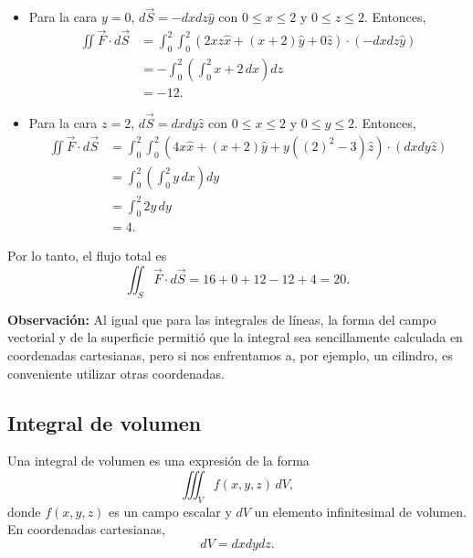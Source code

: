 \begin{ejemplo}
\begin{itemize}
        \item[(iv)] Para la cara $y = 0$, $d\Vec{S} = -dxdz \hat{y}$ con $0 \leq x \leq 2$ y $0 \leq z \leq 2$. Entonces,
        \begin{align*}
             \iint \Vec{F} \cdot d\Vec{S} &= \int_0^2 \int_0^2 (2xz \hat{x} + (x+2) \hat{y} + 0 \hat{z}) \cdot (-dxdz \hat{y})  \\
             &=- \int_0^2 \left( \int_0^2 x+2 \, dx\right) dz\\
             &=  - 12.
        \end{align*}

        \item[(v)] Para la cara $z = 2$, $d\Vec{S} = dxdy \hat{z}$ con $0 \leq x \leq 2$ y $0 \leq y \leq 2$. Entonces,
        \begin{align*}
             \iint \Vec{F} \cdot d\Vec{S} &= \int_0^2 \int_0^2 (4x \hat{x} + (x+2) \hat{y} + y((2)^2-3) \hat{z}) \cdot (dxdy \hat{z})  \\
             &= \int_0^2 \left( \int_0^2 y\, dx\right) dy\\
             &= \int_0^2 2y\,dy \\
             &= 4.
        \end{align*}
    \end{itemize}

    Por lo tanto, el flujo total es
    $$\iint_S \Vec{F} \cdot d\Vec{S} = 16 + 0 + 12 - 12 + 4 = 20.$$
\end{ejemplo}

\textbf{Observación:} Al igual que para las integrales de líneas, la forma del campo vectorial y de la superficie permitió que la integral sea sencillamente calculada en coordenadas cartesianas, pero si nos enfrentamos a, por ejemplo, un cilindro, es conveniente utilizar otras coordenadas.

\subsection{Integral de volumen}

Una integral de volumen es una expresión de la forma
\begin{equation}
\iiint_V f(x,y,z) \,dV,
\end{equation}
donde $f(x,y,z)$ es un campo escalar y $dV$ un elemento infinitesimal de volumen. En coordenadas cartesianas,
\begin{equation}
dV = dx dy dz.
\end{equation}

